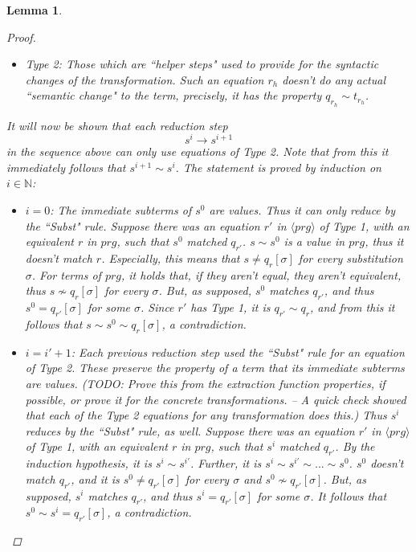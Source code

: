 \documentclass[11pt]{article} %
\newtheorem{lemma}{Lemma}
\begin{document}
\begin{lemma}
\begin{proof}
\begin{itemize}
\item Type 2: Those which are ``helper steps" used to provide for the syntactic changes of the transformation. Such an equation $r_h$ doesn't do any actual ``semantic change" to the term, precisely, it has the property $q_{r_h} \sim t_{r_h}$.
\end{itemize}
It will now be shown that each reduction step
\begin{equation*}
s^i \longrightarrow s^{i+1}
\end{equation*}
in the sequence above can only use equations of Type 2. Note that from this it immediately follows that $s^{i+1} \sim s^i$. The statement is proved by induction on $i \in \mathbb{N}$:
\begin{itemize}
\item $i = 0$: The immediate subterms of $s^0$ are values. Thus it can only reduce by the ``Subst" rule. Suppose there was an equation $r'$ in $\langle prg \rangle$ of Type 1, with an equivalent $r$ in $prg$, such that $s^0$ matched $q_{r'}$. $s \sim s^0$ is a value in $prg$, thus it doesn't match $r$. Especially, this means that $s \neq q_r[\sigma]$ for \textit{every} substitution $\sigma$. For terms of $prg$, it holds that, if they aren't equal, they aren't equivalent, thus $s \not\sim q_r[\sigma]$ for every $\sigma$. But, as supposed, $s^0$ matches $q_{r'}$, and thus $s^0 = q_{r'}[\sigma]$ for some $\sigma$. Since $r'$ has Type 1, it is $q_{r'} \sim q_r$, and from this it follows that $s \sim s^0 \sim q_r[\sigma]$, a contradiction.

\item $i = i' + 1$: Each previous reduction step used the ``Subst" rule for an equation of Type 2. These preserve the property of a term that its immediate subterms are values. (TODO: Prove this from the extraction function properties, if possible, or prove it for the concrete transformations. -- A quick check showed that each of the Type 2 equations for any transformation does this.) Thus $s^i$ reduces by the ``Subst" rule, as well. Suppose there was an equation $r'$ in $\langle prg \rangle$ of Type 1, with an equivalent $r$ in $prg$, such that $s^i$ matched $q_{r'}$.
By the induction hypothesis, it is $s^{i} \sim s^{i'}$. Further, it is $s^i \sim s^{i'} \sim ... \sim s^0$. $s^0$ doesn't match $q_{r'}$, and it is $s^0 \neq q_{r'}[\sigma]$ for every $\sigma$ and $s^0 \not\sim q_{r'}[\sigma]$. But, as supposed, $s^i$ matches $q_{r'}$, and thus $s^i = q_{r'}[\sigma]$ for some $\sigma$. It follows that $s^0 \sim s^i = q_{r'}[\sigma]$, a contradiction.


\end{itemize}
\end{proof}
\end{lemma}
\end{document}
